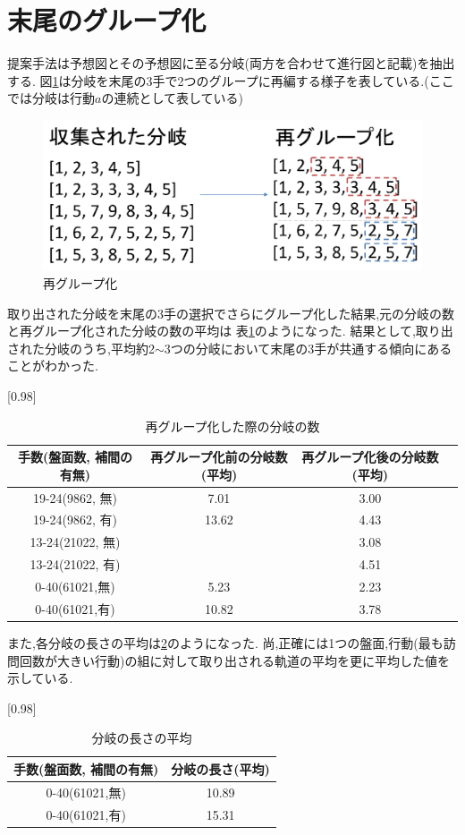 \section{末尾のグループ化}
提案手法は予想図とその予想図に至る分岐(両方を合わせて進行図と記載)を抽出する.
図\ref{fig:regroup}は分岐を末尾の3手で2つのグループに再編する様子を表している.(ここでは分岐は行動$a$の連続として表している)
\begin{figure}[t]
	\centering
	\includegraphics[width=\linewidth]{./figure/regroup.pdf}
	\caption{再グループ化}
	\label{fig:regroup}
\end{figure}
取り出された分岐を末尾の3手の選択でさらにグループ化した結果,元の分岐の数と再グループ化された分岐の数の平均は
表\ref{table:tail}のようになった.
結果として,取り出された分岐のうち,平均約2$\sim$3つの分岐において末尾の3手が共通する傾向にあることがわかった.
\begin{table}[H]
	\caption{再グループ化した際の分岐の数}
    \scriptsize
    \label{table:tail}
	\centering
	\scalebox{0.98}[0.98]{
		\begin{tabular}{c|c|c||c}
			手数(盤面数, 補間の有無)&  再グループ化前の分岐数(平均)&  再グループ化後の分岐数(平均)\\ \hline
			19-24(9862, 無)    & 7.01 & 3.00  \\
			19-24(9862, 有)    & 13.62 & 4.43  \\
			13-24(21022, 無)   &  & 3.08  \\
			13-24(21022, 有)   &  & 4.51 \\
		    0-40(61021,無)& 5.23 & 2.23\\
		    0-40(61021,有)& 10.82 & 3.78\\
		\end{tabular}
	}

	
\end{table}
また,各分岐の長さの平均は\ref{fig:length}のようになった.
尚,正確には1つの盤面,行動(最も訪問回数が大きい行動)の組に対して取り出される軌道の平均を更に平均した値を示している.
\begin{table}[H]
	\caption{分岐の長さの平均}
    \scriptsize
    \label{fig:length}
	\centering
	\scalebox{0.98}[0.98]{
		\begin{tabular}{c|c}
			手数(盤面数, 補間の有無)&  分岐の長さ(平均)\\ \hline
		    0-40(61021,無)& 10.89\\
		    0-40(61021,有)& 15.31\\
		\end{tabular}
	}	
\end{table}

